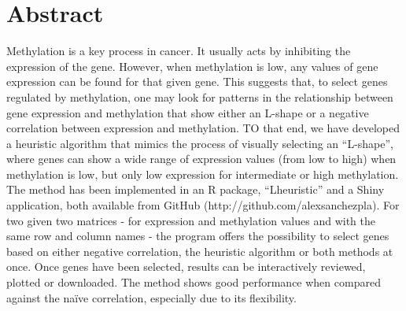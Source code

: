 \documentclass[10pt,letterpaper]{article}
\newcommand{\getIndex}[2]{
  \ForEach{,}{\IfEq{#1}{\thislevelitem}{\number\thislevelcount\ExitForEach}{}}{#2}
}
\newcommand{\getAff}[1]{
  \getIndex{#1}{Universitat de Barcelona (UB),2,}
}
\begin{document}
\vspace*{0.2in}

\section*{Abstract}
Methylation is a key process in cancer. It usually acts by inhibiting
the expression of the gene. However, when methylation is low, any values of
gene expression can be found for that given gene. This suggests that, to select
genes regulated by methylation, one may look for patterns in the relationship
between gene expression and methylation that show either an L-shape or a
negative correlation between expression and methylation. TO that end, we have
developed a heuristic algorithm that mimics the process of visually
selecting an ``L-shape'', where genes can show a wide range of
expression values (from low to high) when methylation is low, but only low
expression for intermediate or high methylation.  
The method has been implemented in an R package,
``Lheuristic'' and a Shiny application, both available from GitHub
(http://github.com/alexsanchezpla). For two given two matrices - for expression 
and methylation values and with the same row and column names - the program
offers the possibility to select genes based on either negative
correlation, the heuristic algorithm or both methods at once. Once genes
have been selected, results can be interactively reviewed, plotted or
downloaded. 
The method shows good performance when compared against  the naïve correlation, 
especially due to its flexibility.
\end{document}
